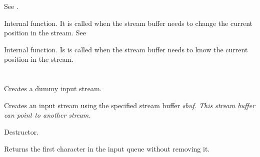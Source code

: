 See .



Internal function. It is called when the stream buffer needs to change the
current position in the stream. See 



Internal function. Is is called when the stream buffer needs to know the
current position in the stream.

\section{}\label{wxinputstream}







Creates a dummy input stream.


Creates an input stream using the specified stream buffer \it{sbuf}. This
stream buffer can point to another stream.



Destructor.



Returns the first character in the input queue without removing it.


